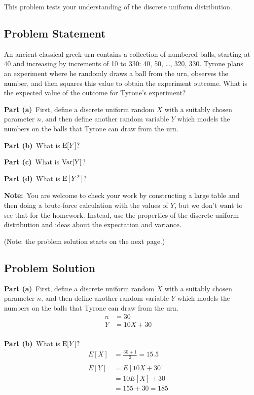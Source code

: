 \documentclass[12pt]{article}
\theoremstyle{definition}
\begin{document}
This problem tests your understanding of the discrete uniform distribution.

\subsection*{Problem Statement}

An ancient classical greek urn contains a collection of numbered balls, starting at 40 and increasing by increments of 10 to 330: 40, 50, \ldots, 320, 330. Tyrone plans an experiment where he randomly draws a ball from the urn, observes the number, and then squares this value to obtain the experiment outcome. What is the expected value of the outcome for Tyrone's experiment?

\bigskip
\noindent
{\bf Part (a)}\ First, define a discrete uniform random $X$ with a suitably chosen parameter $n$, and then define another random variable $Y$ which models the numbers on the balls that Tyrone can draw from the urn.

\bigskip
\noindent
{\bf Part (b)}\ What is $\hbox{E}[Y]?$


\bigskip
\noindent
{\bf Part (c)}\ What is $\hbox{Var}[Y]$?


\bigskip
\noindent
{\bf Part (d)}\ What is $\hbox{E}\left[ Y^2 \right ]$?


\bigskip
\noindent
{\bf Note:}\ You are welcome to check your work by constructing a large table and then doing a brute-force calculation with the values of $Y$, but we don't want to see that for the homework. Instead, use the properties of the discrete uniform distribution and ideas about the expectation and variance.

\bigskip
\noindent
(Note: the problem solution starts on the next page.)

\newpage
\subsection*{Problem Solution}

\noindent
{\bf Part (a)}\ First, define a discrete uniform random $X$ with a suitably chosen parameter $n$, and then define another random variable $Y$ which models the numbers on the balls that Tyrone can draw from the urn.
\begin{align*}
n &= 30\\
Y &= 10X + 30\\
\end{align*}

\noindent
{\bf Part (b)}\ What is $\hbox{E}[Y]?$
\begin{align*}
E[X] &= \frac{30+1}{2}= 15.5\\\\
E[Y] &= E[10X + 30]\\
&= 10 E[X] + 30\\
&= 155 + 30 = 185\\
\end{align*}
\end{document}
